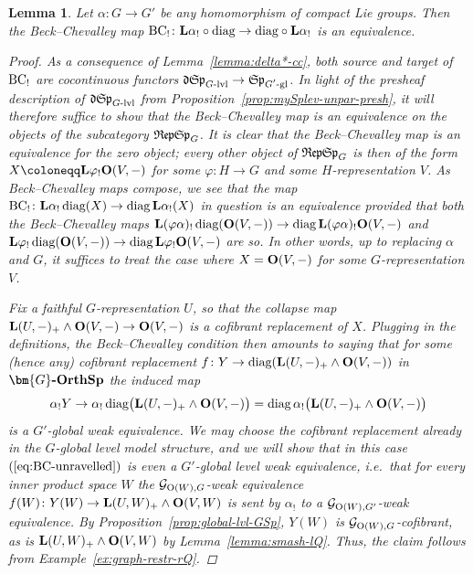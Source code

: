 \documentclass[reqno]{memo-l}
\theoremstyle{mythm}
\newtheorem{lemma}[thm]{Lemma}
\theoremstyle{definition}
\numberwithin{equation}{section}
\renewcommand{\phi}{\varphi}
\newcommand{\cat}[1]{\textbf{\textup{#1}}}
\renewcommand{\O}{{\textup{O}}}
\newcommand{\diag}{\textup{diag}}
\newcommand{\BC}{\textup{BC}}
\let\smashp=\wedge
\newcommand{\mySp}{{\mathfrak S\kern-.5pt\mathfrak p}}
\newcommand{\myLSp}{{\mathfrak d\kern-.25pt}\mySp}
\newcommand{\mySph}{{\mathfrak R\kern-.5pt\mathfrak e\kern-.5pt\mathfrak p\kern-.5pt\mathfrak S\kern-.5pt\mathfrak p}}
\newcommand{\Gosp}[1]{\cat{$\bm{#1}$-OrthSp}}
\begin{document}
\begin{lemma}\label{lemma:delta*-gl-cc}
    Let $\alpha\colon G\to G'$ be any homomorphism of compact Lie groups. Then the Beck--Chevalley map $\BC_!\colon\cat{L}\alpha_!\circ\diag\to\diag\circ\cat{L}\alpha_!$ is an equivalence.    
    \begin{proof}
        As a consequence of Lemma~\ref{lemma:delta*-cc}, both source and target of $\BC_!$ are cocontinuous functors $\myLSp_\text{$G$-lvl}\to\mySp_\text{$G'$-gl}$. In light of the presheaf description of $\myLSp_\text{$G$-lvl}$ from Proposition~\ref{prop:mySplev-unpar-presh}, it will therefore suffice to show that the Beck--Chevalley map is an equivalence on the objects of the subcategory $\mySph_G$. It is clear that the Beck--Chevalley map is an equivalence for the zero object; every other object of $\mySph_G$ is then of the form $X\coloneqq\cat{L}\phi_!\cat{O}(V,-)$ for some $\phi\colon H\to G$ and some $H$-representation $V$. As Beck--Chevalley maps compose, we see that the map $\BC_!\colon\cat{L}\alpha_!\,\diag(X)\to\diag\,\cat{L}\alpha_!(X)$ in question is an equivalence provided that both the Beck--Chevalley maps
            $\cat{L}(\phi\alpha)_!\,\diag(\cat{O}(V,-))\to\diag\,\cat{L}(\phi\alpha)_!\cat{O}(V,-)$
           and
            $\cat{L}\phi_!\,\diag(\cat{O}(V,-))\to\diag\,\cat{L}\phi_!\cat{O}(V,-)$
        are so. In other words, up to replacing $\alpha$ and $G$, it suffices to treat the case where $X=\cat{O}(V,-)$ for some $G$-representation $V$.
        
        Fix a faithful $G$-representation $U$, so that the collapse map $\cat{L}(U,-)_+\smashp\cat{O}(V,-)\to\cat{O}(V,-)$ is a cofibrant replacement of $X$. Plugging in the definitions, the Beck--Chevalley condition then amounts to saying that for some (hence any) cofibrant replacement $f\colon Y\to\diag(\cat{L}(U,-)_+\smashp\cat{O}(V,-))$ in $\Gosp{G}$ the induced map 
        \begin{equation}\label{eq:BC-unravelled}
            \alpha_!Y\to\alpha_!\,\diag\big(\cat{L}(U,-)_+\smashp\cat{O}(V,-)\big)=\diag\,\alpha_!\big(\cat{L}(U,-)_+\smashp\cat{O}(V,-)\big)
        \end{equation} 
        is a $G'$-global weak equivalence. We may choose the cofibrant replacement already in the $G$-global level model structure, and we will show that in this case $(\ref{eq:BC-unravelled})$ is even a $G'$-global \emph{level} weak equivalence, i.e.\ that for every inner product space $W$ the $\mathcal G_{\O(W),G}$-weak equivalence $f(W)\colon Y(W)\to\cat{L}(U,W)_+\smashp\cat{O}(V,W)$ is sent by $\alpha_!$ to a $\mathcal G_{\O(W),G'}$-weak equivalence. By Proposition~\ref{prop:global-lvl-GSp}, $Y(W)$ is $\mathcal G_{\O(W),G}$-cofibrant, as is $\cat{L}(U,W)_+\smashp\cat{O}(V,W)$ by Lemma~\ref{lemma:smash-lQ}. Thus, the claim follows from Example~\ref{ex:graph-restr-rQ}.
    \end{proof}
\end{lemma}
\end{document}
